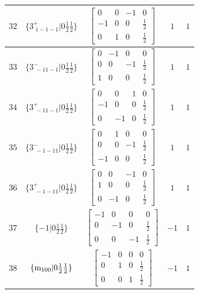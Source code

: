 \documentclass[fleqn,8pt]{jsarticle}
\begin{document}
\begin{longtable}{ccccc}
$ 32 $ & $ \{3^{+}_{\,\,1-1-1}|0 \frac{1}{2} \frac{1}{2}\} $ & $ \begin{bmatrix} 0 & 0 & -1 & 0 \\ -1 & 0 & 0 & \frac{1}{2} \\ 0 & 1 & 0 & \frac{1}{2} \end{bmatrix} $ & $ 1 $ & $ 1 $ \\ \hline
$ 33 $ & $ \{3^{-}_{\,\,-11-1}|0 \frac{1}{2} \frac{1}{2}\} $ & $ \begin{bmatrix} 0 & -1 & 0 & 0 \\ 0 & 0 & -1 & \frac{1}{2} \\ 1 & 0 & 0 & \frac{1}{2} \end{bmatrix} $ & $ 1 $ & $ 1 $ \\ \hline
$ 34 $ & $ \{3^{+}_{\,\,-11-1}|0 \frac{1}{2} \frac{1}{2}\} $ & $ \begin{bmatrix} 0 & 0 & 1 & 0 \\ -1 & 0 & 0 & \frac{1}{2} \\ 0 & -1 & 0 & \frac{1}{2} \end{bmatrix} $ & $ 1 $ & $ 1 $ \\ \hline
$ 35 $ & $ \{3^{-}_{\,\,-1-11}|0 \frac{1}{2} \frac{1}{2}\} $ & $ \begin{bmatrix} 0 & 1 & 0 & 0 \\ 0 & 0 & -1 & \frac{1}{2} \\ -1 & 0 & 0 & \frac{1}{2} \end{bmatrix} $ & $ 1 $ & $ 1 $ \\ \hline
$ 36 $ & $ \{3^{+}_{\,\,-1-11}|0 \frac{1}{2} \frac{1}{2}\} $ & $ \begin{bmatrix} 0 & 0 & -1 & 0 \\ 1 & 0 & 0 & \frac{1}{2} \\ 0 & -1 & 0 & \frac{1}{2} \end{bmatrix} $ & $ 1 $ & $ 1 $ \\ \hline
$ 37 $ & $ \{-1|0 \frac{1}{2} \frac{1}{2}\} $ & $ \begin{bmatrix} -1 & 0 & 0 & 0 \\ 0 & -1 & 0 & \frac{1}{2} \\ 0 & 0 & -1 & \frac{1}{2} \end{bmatrix} $ & $ -1 $ & $ 1 $ \\ \hline
$ 38 $ & $ \{{\rm m}_{100}|0 \frac{1}{2} \frac{1}{2}\} $ & $ \begin{bmatrix} -1 & 0 & 0 & 0 \\ 0 & 1 & 0 & \frac{1}{2} \\ 0 & 0 & 1 & \frac{1}{2} \end{bmatrix} $ & $ -1 $ & $ 1 $ \\ \hline

\end{longtable}
\end{document}
